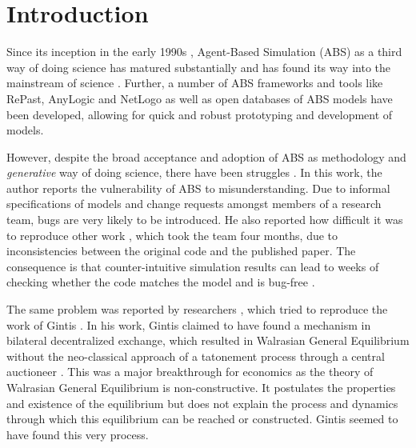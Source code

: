 \section{Introduction}
\label{sec:introduction}
Since its inception in the early 1990s \cite{epstein_growing_1996,siebers_introduction_2008,wooldridge_introduction_2009}, Agent-Based Simulation (ABS) as a third way of doing science \cite{axelrod_advancing_1997,axelrod_guide_2006} has matured substantially and has found its way into the mainstream of science \cite{macal_everything_2016}. Further, a number of ABS frameworks and tools like RePast, AnyLogic and NetLogo as well as open databases of ABS models \cite{openabm_model_database}
have been developed, allowing for quick and robust prototyping and development of models.  

However, despite the broad acceptance and adoption of ABS as methodology and \textit{generative} way of doing science, there have been struggles \cite{axelrod_chapter_2006}. In this work, the author reports the vulnerability of ABS to misunderstanding. Due to informal specifications of models and change requests amongst members of a research team, bugs are very likely to be introduced. He also reported how difficult it was to reproduce other work \cite{axelrod_convergence_1995}, which took the team four months, due to inconsistencies between the original code and the published paper. The consequence is that counter-intuitive simulation results can lead to weeks of checking whether the code matches the model and is bug-free \cite{axelrod_advancing_1997}.

The same problem was reported by researchers \cite{ionescu_dependently-typed_2012}, which tried to reproduce the work of Gintis \cite{gintis_emergence_2006}. In his work, Gintis claimed to have found a mechanism in bilateral decentralized exchange, which resulted in Walrasian General Equilibrium without the neo-classical approach of a tatonement process through a central auctioneer \cite{colell_microeconomic_1995}. This was a major breakthrough for economics as the theory of Walrasian General Equilibrium is non-constructive. It postulates the properties and existence of the equilibrium but does not explain the process and dynamics through which this equilibrium can be reached or constructed. Gintis seemed to have found this very process.

